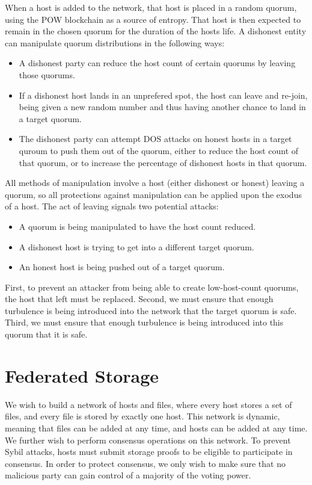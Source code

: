 \documentclass[twocolumn]{article}
\begin{document}
When a host is added to the network, that host is placed in a random quorum, using the POW blockchain as a source of entropy.
That host is then expected to remain in the chosen quorum for the duration of the hosts life.
A dishonest entity can manipulate quorum distributions in the following ways:
\begin{itemize}
	\item A dishonest party can reduce the host count of certain quorums by leaving those quorums.
	\item If a dishonest host lands in an unprefered spot, the host can leave and re-join, being given a new random number and thus having another chance to land in a target quorum.
	\item The dishonest party can attempt DOS attacks on honest hosts in a target quroum to push them out of the quorum, either to reduce the host count of that quorum, or to increase the percentage of dishonest hosts in that quorum.
\end{itemize}

All methods of manipulation involve a host (either dishonest or honest) leaving a quorum, so all protections against manipulation can be applied upon the exodus of a host.
The act of leaving signals two potential attacks:
\begin{itemize}
	\item A quorum is being manipulated to have the host count reduced.
	\item A dishonest host is trying to get into a different target quorum.
	\item An honest host is being pushed out of a target quorum.
\end{itemize}

First, to prevent an attacker from being able to create low-host-count quorums, the host that left must be replaced.
Second, we must ensure that enough turbulence is being introduced into the network that the target quorum is safe.
Third, we must ensure that enough turbulence is being introduced into this quorum that it is safe.

\section{Federated Storage}
We wish to build a network of hosts and files, where every host stores a set of files, and every file is stored by exactly one host.
This network is dynamic, meaning that files can be added at any time, and hosts can be added at any time.
We further wish to perform consensus operations on this network.
To prevent Sybil attacks, hosts must submit storage proofs to be eligible to participate in consensus.
In order to protect consensus, we only wish to make sure that no malicious party can gain control of a majority of the voting power.
\end{document}
